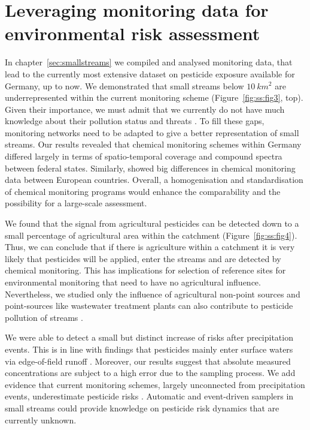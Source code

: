 \section{Leveraging monitoring data for environmental risk assessment}
In chapter~\ref{sec:smallstreams} we compiled and analysed monitoring data, that lead to the currently most extensive dataset on pesticide exposure available for Germany, up to now. 
We demonstrated that small streams below $10~km^2$ are underrepresented within the current monitoring scheme (Figure~\ref{fig:ss:fig3}, top).
Given their importance, we must admit that we currently do not have much knowledge about their pollution status and threats \citep{biggs_importance_2016, lorenz_specifics_2016}. 
To fill these gaps, monitoring networks need to be adapted to give a better representation of small streams. 
Our results revealed that chemical monitoring schemes within Germany differed largely in terms of spatio-temporal coverage and compound spectra between federal states. 
Similarly, \citet{malaj_organic_2014} showed big differences in chemical monitoring data between European countries.
Overall, a homogenisation and standardisation of chemical monitoring programs  would enhance the comparability and the possibility for a large-scale assessment.

We found that the signal from agricultural pesticides can be detected down to a small percentage of agricultural area within the catchment (Figure~\ref{fig:ss:fig4}).
Thus, we can conclude that if there is agriculture within a catchment it is very likely that pesticides will be applied, enter the streams and are detected by chemical monitoring.
This has implications for selection of reference sites for environmental monitoring that need to have no agricultural influence.
Nevertheless, we studied only the influence of agricultural non-point sources and point-sources like wastewater treatment plants can also contribute to pesticide pollution of streams \citep{bunzel_landscape_2014}.

We were able to detect a small but distinct increase of risks after precipitation events. 
This is in line with findings that pesticides mainly enter surface waters via edge-of-field runoff \citep{schulz_comparison_2001}.
Moreover, our results suggest that absolute measured concentrations are subject to a high error due to the sampling process.
We add evidence that current monitoring schemes, largely unconnected from precipitation events, underestimate pesticide risks \citep{xing_influences_2013, stehle_probabilistic_2013}. 
Automatic and event-driven samplers in small streams could provide knowledge on pesticide risk dynamics that are currently unknown. 

